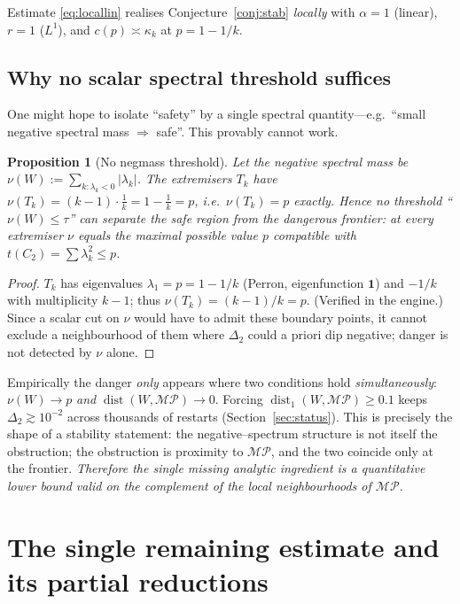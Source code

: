 \documentclass[11pt]{article}
\newtheorem{proposition}[theorem]{Proposition}
\theoremstyle{definition}
\newcommand{\one}{\mathbf 1}
\newcommand{\dist}{\operatorname{dist}}
\newcommand{\MP}{\mathcal{MP}}
\newcommand{\Tk}{T_k}
\begin{document}
Estimate \eqref{eq:locallin} realises Conjecture~\ref{conj:stab} \emph{locally}
with $\alpha=1$ (linear), $r=1$ ($L^1$), and $c(p)\asymp\kappa_k$ at $p=1-1/k$.

\subsection{Why no scalar spectral threshold suffices}\label{sec:noscalar}

One might hope to isolate ``safety'' by a single spectral quantity---e.g.\ ``small
negative spectral mass $\Rightarrow$ safe''.  This provably cannot work.

\begin{proposition}[No negmass threshold]\label{prop:noscalar}
Let the negative spectral mass be $\nu(W):=\sum_{k:\lambda_k<0}|\lambda_k|$.  The
extremisers $\Tk$ have $\nu(\Tk)=(k-1)\cdot\tfrac1k=1-\tfrac1k=p$, i.e.\
$\nu(\Tk)=p$ \emph{exactly}.  Hence no threshold ``$\nu(W)\le\tau$'' can separate
the safe region from the dangerous frontier: at every extremiser $\nu$ equals the
maximal possible value $p$ compatible with $t(C_2)=\sum\lambda_k^2\le p$.
\end{proposition}
\begin{proof}
$\Tk$ has eigenvalues $\lambda_1=p=1-1/k$ (Perron, eigenfunction $\one$) and
$-1/k$ with multiplicity $k-1$; thus $\nu(\Tk)=(k-1)/k=p$.  (Verified in the
engine.)  Since a scalar cut on $\nu$ would have to admit these boundary points,
it cannot exclude a neighbourhood of them where $\Delta_2$ could a priori dip
negative; danger is not detected by $\nu$ alone.
\end{proof}

Empirically the danger \emph{only} appears where two conditions hold
\emph{simultaneously}: $\nu(W)\to p$ \emph{and} $\dist(W,\MP)\to0$.  Forcing
$\dist_1(W,\MP)\ge0.1$ keeps $\Delta_2\gtrsim10^{-2}$ across thousands of restarts
(Section~\ref{sec:status}).  This is precisely the shape of a stability statement:
the negative--spectrum structure is not itself the obstruction; the obstruction is
proximity to $\MP$, and the two coincide only at the frontier.  \emph{Therefore the
single missing analytic ingredient is a quantitative lower bound valid on the
complement of the local neighbourhoods of $\MP$.}

\section{The single remaining estimate and its partial reductions}\label{sec:remaining}
\end{document}
